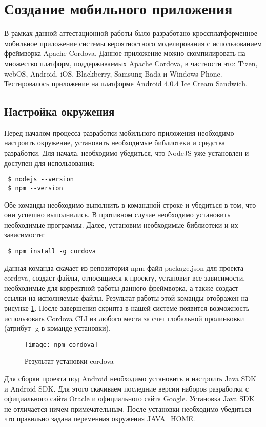 \section{Создание мобильного приложения}

В рамках данной аттестационной работы было разработано кроссплатформенное мобильное приложение системы вероятностного моделирования с использованием фреймворка Apache Cordova. Данное приложение можно скомпилировать на множество платформ, поддерживаемых Apache Cordova, в частности это: Tizen, webOS, Android, iOS, Blackberry, Samsung Bada и Windows Phone. Тестировалось приложение на платформе Android 4.0.4 Ice Cream Sandwich.

\subsection{Настройка окружения}
Перед началом процесса разработки мобильного приложения необходимо настроить окружение, установить необходимые библиотеки и средства разработки. Для начала, необходимо убедиться, что NodeJS уже установлен и доступен для использования:
\begin{lstlisting}
 $ nodejs --version
 $ npm --version
\end{lstlisting}

Обе команды необходимо выполнить в командной строке и убедиться в том, что они успешно выполнились. В противном случае необходимо установить необходимые программы. Далее, установим необходимые библиотеки и их зависимости:
\begin{lstlisting}
 $ npm install -g cordova
\end{lstlisting}

Данная команда скачает из репозитория npm файл package.json для проекта cordova, создаст файлы, относящиеся к проекту, установит все зависимости, необходимые для корректной работы данного фреймворка, а также создаст ссылки на исполняемые файлы. Результат работы этой команды отображен на рисунке \ref{npm_cordova}. После завершения скрипта в нашей системе появится возможность использовать Cordova CLI из любого места за счет глобальной пролинковки (атрибут -g в команде установки).

\begin{figure}[ht]
\center\texttt{[image: npm\_cordova]}
\caption{Результат установки cordova}\label{npm_cordova}
\end{figure}

Для сборки проекта под Android необходимо установить и настроить Java SDK и Android SDK. Для этого скачиваем последние версии наборов разработки с официального сайта Oracle\cite{cordova:java_sdk} и официального сайта Google\cite{cordova:android_sdk}. Установка Java SDK не отличается ничем примечательным. После установки необходимо убедиться что правильно задана переменная окружения JAVA\_HOME.

